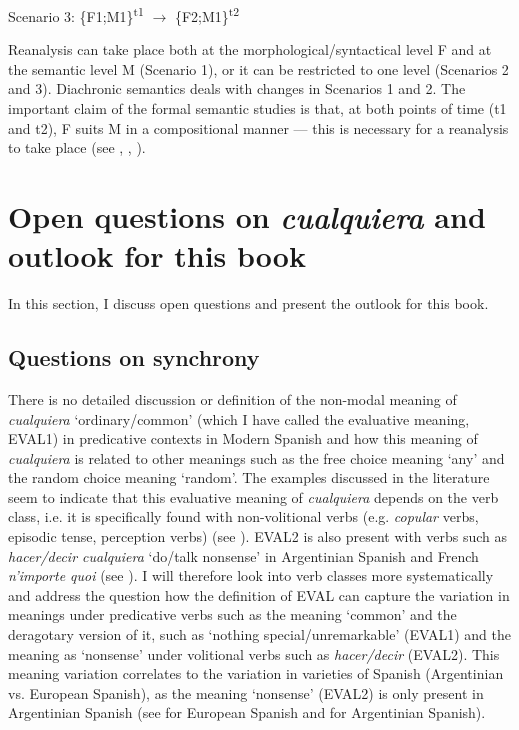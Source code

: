   Scenario 3: \{F1;M1\}\textsuperscript{t1} $\rightarrow$  
  \{F2;M1\}\textsuperscript{t2}
\z

Reanalysis can take place both at the morphological/syntactical level F and at the semantic level M (Scenario 1), or it can be restricted to one level (Scenarios 2 and 3). Diachronic semantics deals with changes in Scenarios 1 and 2. The important claim of the formal semantic studies is that, at both points of time (t1 and t2), F suits M in a compositional manner — this is necessary for a reanalysis to take place (see \citealt{Eckardt2006}, \citealt{Bar-asher-siegal2020}, \citealt{Aloni2021}).

\section{{Open} {questions} {on} {\textit{cualquiera}}{} {and} {outlook} {for} {this} {book}} \label{sec:2.7}

 In this section, I discuss open questions and present the outlook for this book.

\subsection{{Questions} {on} {synchrony}} \label{sec:2.7.1}

There is no detailed discussion or definition of the non-modal meaning of \textit{cualquiera} ‘ordinary/common’ (which I have called the evaluative meaning, EVAL1) in predicative contexts in Modern Spanish and how this meaning of \textit{cualquiera} is related to other meanings such as the free choice meaning ‘any’ and the random choice meaning ‘random’. The examples discussed in the literature seem to indicate that this evaluative meaning of \textit{cualquiera} depends on the verb class, i.e. it is specifically found with non-volitional verbs (e.g. \textit{copular} verbs, episodic tense, perception verbs) (see ). EVAL2 is also present with verbs such as \textit{hacer/decir cualquiera} ‘do/talk nonsense’ in Argentinian Spanish and French \textit{n’importe quoi} (see ). I will therefore look into verb classes more systematically and address the question how the definition of EVAL can capture the variation in meanings under predicative verbs such as the meaning ‘common’ and the deragotary version of it, such as ‘nothing special/unremarkable’ (EVAL1) and the meaning as ‘nonsense’ under volitional verbs such as \textit{hacer/decir} (EVAL2). This meaning variation correlates to the variation in varieties of Spanish (Argentinian vs. European Spanish), as the meaning ‘nonsense’ (EVAL2) is only present in Argentinian Spanish (see  for European Spanish and  for Argentinian Spanish).

